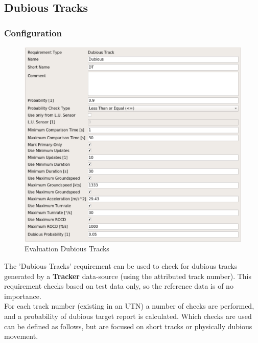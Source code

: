 \subsection{Dubious Tracks}
\label{sec:eval_req_dubious_tracks} 

\subsubsection{Configuration}

\begin{figure}[H]
    \includegraphics[width=14cm,frame]{figures/eval_req_dubious_tracks.png}
   \caption{Evaluation Dubious Tracks}
\end{figure}

The 'Dubious Tracks' requirement can be used to check for dubious tracks generated by a \textbf{Tracker} data-source (using the attributed track number). This requirement checks based on test data only, so the reference data is of no importance. \\

For each track number (existing in an UTN) a number of checks are performed, and a probability of dubious target report is calculated. Which checks are used can be defined as follows, but are focused on short tracks or physically dubious movement. \\


